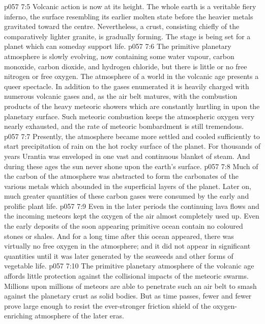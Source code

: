 \vs p057 7:5 Volcanic action is now at its height. The whole earth is a veritable fiery inferno, the surface resembling its earlier molten state before the heavier metals gravitated toward the centre.  Nevertheless, a crust, consisting chiefly of the comparatively lighter granite, is gradually forming. The stage is being set for a planet which can someday support life.
\vs p057 7:6 \pc The primitive planetary atmosphere is slowly evolving, now containing some water vapour, carbon monoxide, carbon dioxide, and hydrogen chloride, but there is little or no free nitrogen or free oxygen. The atmosphere of a world in the volcanic age presents a queer spectacle. In addition to the gases enumerated it is heavily charged with numerous volcanic gases and, as the air belt matures, with the combustion products of the heavy meteoric showers which are constantly hurtling in upon the planetary surface. Such meteoric combustion keeps the atmospheric oxygen very nearly exhausted, and the rate of meteoric bombardment is still tremendous.
\vs p057 7:7 \pc Presently, the atmosphere became more settled and cooled sufficiently to start precipitation of rain on the hot rocky surface of the planet. For thousands of years Urantia was enveloped in one vast and continuous blanket of steam. And during these ages the sun never shone upon the earth’s surface.
\vs p057 7:8 Much of the carbon of the atmosphere was abstracted to form the carbonates of the various metals which abounded in the superficial layers of the planet. Later on, much greater quantities of these carbon gases were consumed by the early and prolific plant life.
\vs p057 7:9 Even in the later periods the continuing lava flows and the incoming meteors kept the oxygen of the air almost completely used up. Even the early deposits of the soon appearing primitive ocean contain no coloured stones or shales. And for a long time after this ocean appeared, there was virtually no free oxygen in the atmosphere; and it did not appear in significant quantities until it was later generated by the seaweeds and other forms of vegetable life.
\vs p057 7:10 The primitive planetary atmosphere of the volcanic age affords little protection against the collisional impacts of the meteoric swarms. Millions upon millions of meteors are able to penetrate such an air belt to smash against the planetary crust as solid bodies. But as time passes, fewer and fewer prove large enough to resist the ever\hyp{}stronger friction shield of the oxygen\hyp{}enriching atmosphere of the later eras.
